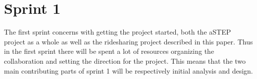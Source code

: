 \chapter{Sprint 1}
The first sprint concerns with getting the project started, both the aSTEP project as a whole as well as the ridesharing project described in this paper.
Thus in the first sprint there will be spent a lot of resources organizing the collaboration and setting the direction for the project.
This means that the two main contributing parts of sprint 1 will be respectively initial analysis and design.


%
%